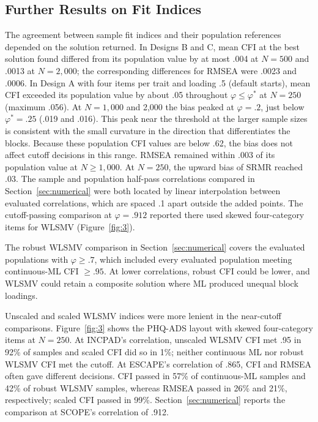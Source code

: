 \subsection{Further Results on Fit Indices}
\label{supp:fit}

The agreement between sample fit indices and their population references depended on the solution returned. In Designs B and C, mean CFI at the best solution found differed from its population value by at most .004 at $N=500$ and .0013 at $N=2{,}000$; the corresponding differences for RMSEA were .0023 and .0006. In Design A with four items per trait and loading .5 (default starts), mean CFI exceeded its population value by about .05 throughout $\varphi\le\varphi^*$ at $N=250$ (maximum .056). At $N=1{,}000$ and 2,000 the bias peaked at $\varphi=.2$, just below $\varphi^*=.25$ (.019 and .016). This peak near the threshold at the larger sample sizes is consistent with the small curvature in the direction that differentiates the blocks. Because these population CFI values are below .62, the bias does not affect cutoff decisions in this range. RMSEA remained within .003 of its population value at $N\ge1{,}000$. At $N=250$, the upward bias of SRMR reached .03. The sample and population half-pass correlations compared in Section~\ref{sec:numerical} were both located by linear interpolation between evaluated correlations, which are spaced .1 apart outside the added points. The cutoff-passing comparison at $\varphi=.912$ reported there used skewed four-category items for WLSMV (Figure~\ref{fig:3}).

The robust WLSMV comparison in Section~\ref{sec:numerical} covers the evaluated populations with $\varphi\ge.7$, which included every evaluated population meeting continuous-ML CFI $\ge.95$. At lower correlations, robust CFI could be lower, and WLSMV could retain a composite solution where ML produced unequal block loadings.

Unscaled and scaled WLSMV indices were more lenient in the near-cutoff comparisons. Figure~\ref{fig:3} shows the PHQ-ADS layout with skewed four-category items at $N=250$. At INCPAD's correlation, unscaled WLSMV CFI met .95 in 92\% of samples and scaled CFI did so in 1\%; neither continuous ML nor robust WLSMV CFI met the cutoff. At ESCAPE's correlation of .865, CFI and RMSEA often gave different decisions. CFI passed in 57\% of continuous-ML samples and 42\% of robust WLSMV samples, whereas RMSEA passed in 26\% and 21\%, respectively; scaled CFI passed in 99\%. Section~\ref{sec:numerical} reports the comparison at SCOPE's correlation of .912.

